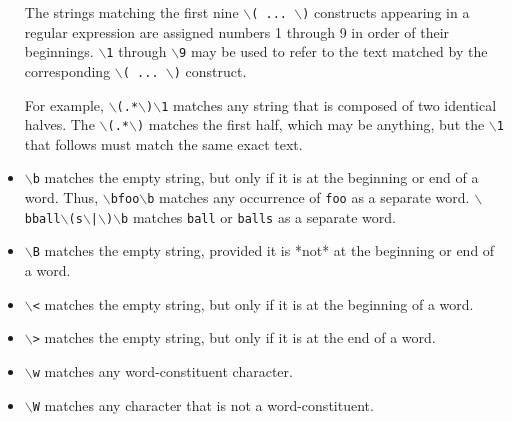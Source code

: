 \begin{itemize}
The strings matching the first nine {\tt $\backslash$( ... $\backslash$)} constructs
appearing in a regular expression are assigned numbers 1 through
9 in order of their beginnings. {\tt $\backslash$1} through {\tt $\backslash$9} may be used
to refer to the text matched by the corresponding {\tt $\backslash$( ... $\backslash$)} 
construct.

For example, {\tt $\backslash$(.*$\backslash$)$\backslash$1} matches any string that is composed of
two identical halves. The {\tt $\backslash$(.*$\backslash$)} matches the first half,
which may be anything, but the {\tt $\backslash$1} that follows must match the
same exact text.

\item \rtfsp
{\tt $\backslash$b} 
matches the empty string, but only if it is at the beginning or
end of a word. Thus, {\tt $\backslash$bfoo$\backslash$b} matches any occurrence of {\tt foo}
as a separate word. {\tt $\backslash$bball$\backslash$(s$\backslash$|$\backslash$)$\backslash$b} matches {\tt ball} or {\tt balls}
as a separate word.

\item \rtfsp
{\tt $\backslash$B} 
matches the empty string, provided it is *not* at the beginning
or end of a word.

\item \rtfsp
{\tt $\backslash$<} 
matches the empty string, but only if it is at the beginning of
a word.

\item \rtfsp
{\tt $\backslash$>} 
matches the empty string, but only if it is at the end of a word.

\item \rtfsp
{\tt $\backslash$w} 
matches any word-constituent character.

\item \rtfsp
{\tt $\backslash$W} 
matches any character that is not a word-constituent.

\end{itemize}




